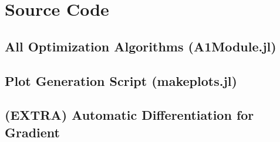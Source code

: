\documentclass{article}
\begin{document}
    \appendix
    \section{Source Code}

    \subsection{All Optimization Algorithms (A1Module.jl)}

    \subsection{Plot Generation Script (makeplots.jl)}

    \subsection{(EXTRA) Automatic Differentiation for Gradient}

    
\end{document}
